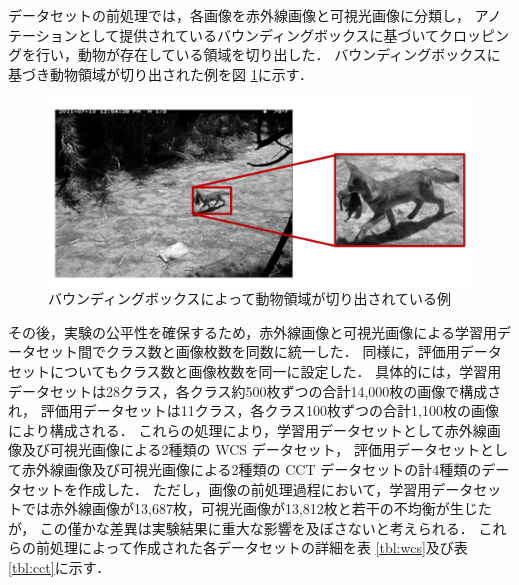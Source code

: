 データセットの前処理では，各画像を赤外線画像と可視光画像に分類し，
アノテーションとして提供されているバウンディングボックスに基づいてクロッピングを行い，動物が存在している領域を切り出した．
バウンディングボックスに基づき動物領域が切り出された例を図 \ref{fig:cropping}に示す．
% 
\begin{figure}[tbp]
  \centering
  \includegraphics[width=\linewidth, keepaspectratio]{image/cropping.png}
  \caption{バウンディングボックスによって動物領域が切り出されている例}
  \label{fig:cropping}
\end{figure}
% 
その後，実験の公平性を確保するため，赤外線画像と可視光画像による学習用データセット間でクラス数と画像枚数を同数に統一した．
同様に，評価用データセットについてもクラス数と画像枚数を同一に設定した．
具体的には，学習用データセットは28クラス，各クラス約500枚ずつの合計14,000枚の画像で構成され，
評価用データセットは11クラス，各クラス100枚ずつの合計1,100枚の画像により構成される．
これらの処理により，学習用データセットとして赤外線画像及び可視光画像による2種類の WCS データセット，
評価用データセットとして赤外線画像及び可視光画像による2種類の CCT データセットの計4種類のデータセットを作成した．
ただし，画像の前処理過程において，学習用データセットでは赤外線画像が13,687枚，可視光画像が13,812枚と若干の不均衡が生じたが，
この僅かな差異は実験結果に重大な影響を及ぼさないと考えられる．
これらの前処理によって作成された各データセットの詳細を表 \ref{tbl:wcs}及び表 \ref{tbl:cct}に示す．

